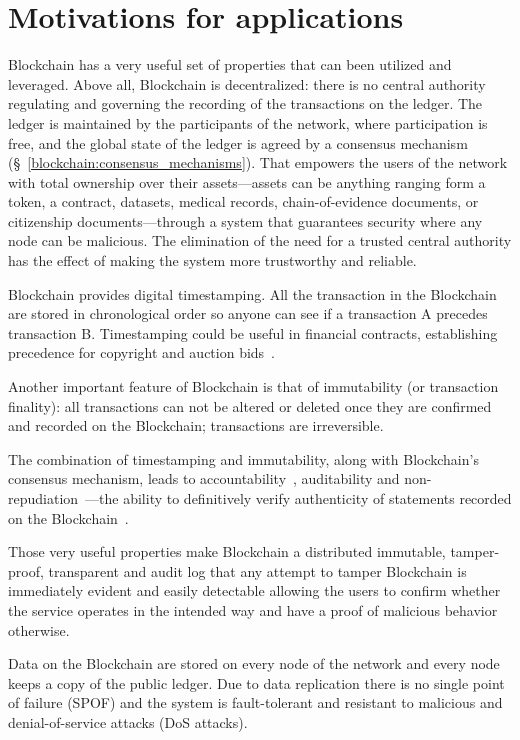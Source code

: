 \section{Motivations for applications}\label{problem:motivations}

Blockchain has a very useful set of properties that can been utilized and leveraged. Above all, Blockchain is decentralized: there is no central authority regulating and governing the recording of the transactions on the ledger. The ledger is maintained by the participants of the network, where participation is free, and the global state of the ledger is agreed by a consensus mechanism (§~\ref{blockchain:consensus_mechanisms}). That empowers the users of the network with total ownership over their assets---assets can be anything ranging form a token, a contract, datasets, medical records, chain-of-evidence documents, or citizenship documents---through a system that guarantees security where any node can be malicious. The elimination of the need for a trusted central authority has the effect of making the system more trustworthy and reliable.

Blockchain provides digital timestamping. All the transaction in the Blockchain are stored in chronological order so anyone can see if a transaction A precedes transaction B. Timestamping could be useful in financial contracts, establishing precedence for copyright and auction bids~\cite{bl_auditability}.

Another important feature of Blockchain is that of immutability (or transaction finality): all transactions can not be altered or deleted once they are confirmed and recorded on the Blockchain; transactions are irreversible.

The combination of timestamping and immutability, along with Blockchain's consensus mechanism, leads to  accountability~\cite{10.1007/978-3-540-46588-1_20}, auditability and non-repudiation~\cite{non_repudiation}---the ability
to definitively verify authenticity of statements recorded on the Blockchain~\cite{bl_auditability}.

Those very useful properties make Blockchain a distributed immutable, tamper-proof, transparent and audit log that any attempt to tamper Blockchain is immediately evident and easily detectable allowing the users to confirm whether the service operates in the intended way and have a proof of malicious behavior otherwise.

Data on the Blockchain are stored on every node of the network and every node keeps a copy of the public ledger. Due to data replication there is no single point of failure (SPOF) and the system is fault-tolerant and resistant to malicious and denial-of-service attacks (DoS attacks).

